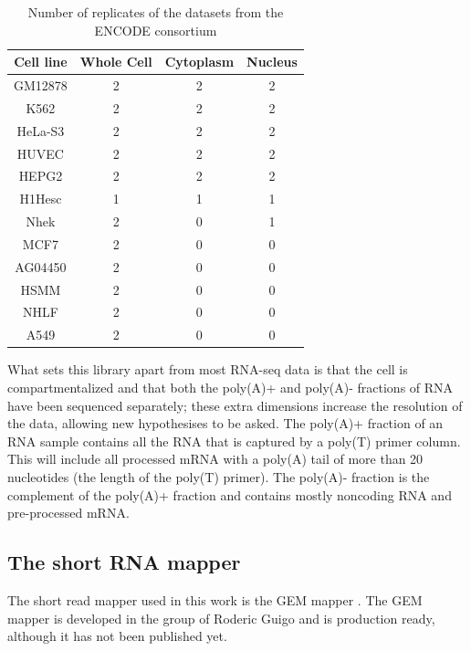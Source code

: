 \begin{table}
	\centering
	\begin{tabular}{cccc}
	  Cell line & Whole Cell & Cytoplasm & Nucleus \\
	  \midrule
	  GM12878 & 2 & 2 & 2 \\
	  K562 & 2 & 2 & 2 \\
	  HeLa-S3 & 2 & 2 & 2 \\
	  HUVEC & 2 & 2 & 2 \\
	  HEPG2 & 2 & 2 & 2 \\
	  H1Hesc & 1 & 1 & 1 \\
	  Nhek & 2 & 0 & 1 \\
	  MCF7 & 2 & 0 & 0 \\
	  AG04450 & 2 & 0 & 0 \\
	  HSMM & 2 & 0 & 0 \\
	  NHLF & 2 & 0 & 0 \\
	  A549 & 2 & 0 & 0 \\
	\end{tabular}
	\caption{Number of replicates of the datasets from the ENCODE consortium}
	\label{tab:Datasets}
\end{table}

What sets this library apart from most RNA-seq data is that the cell is
compartmentalized and that both the poly(A)+ and poly(A)- fractions of RNA have
been sequenced separately; these extra dimensions increase the resolution of
the data, allowing new hypothesises to be asked. The poly(A)+ fraction of
an RNA sample contains all the RNA that is captured by a poly(T) primer column.
This will include all processed mRNA with a poly(A) tail of more than 20
nucleotides (the length of the poly(T) primer). The poly(A)- fraction is the
complement of the poly(A)+ fraction and contains mostly noncoding RNA and
pre-processed mRNA.

\subsection{The short RNA mapper}
The short read mapper used in this work is the GEM mapper
\cite{ribeca_gem_2010}. The GEM mapper is developed in the group of Roderic
Guigo and is production ready, although it has not been published yet.

